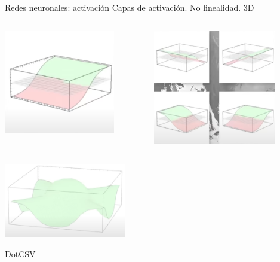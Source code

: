\begin{frame}{Redes neuronales: activación}
Capas de activación. No linealidad. 3D

\begin{columns}[c]
\centering
\begin{column}{0.5\textwidth}
    \centering
    \includegraphics[width=0.8\textwidth]{Slides/figures/Introduccion/activacion_3d.png}
\end{column}
\begin{column}{0.5\textwidth}
    \centering
    \includegraphics[width=0.8\textwidth]{Slides/figures/Introduccion/activacion_3d_varias.png}
\end{column}
\end{columns}

\centering
\includegraphics[width=0.4\textwidth]{Slides/figures/Introduccion/activacion_3d_combi.png}

\scriptsize{DotCSV}

\end{frame}

